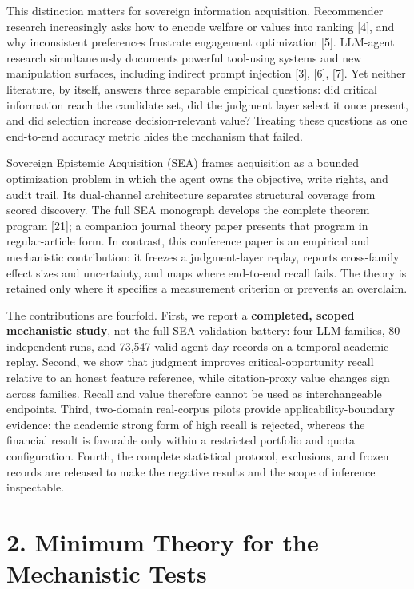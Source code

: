 \documentclass[
  conference,10pt]{IEEEtran}
\begin{document}
This distinction matters for sovereign information acquisition. Recommender research increasingly asks how to encode welfare or values into ranking {[}4{]}, and why inconsistent preferences frustrate engagement optimization {[}5{]}. LLM-agent research simultaneously documents powerful tool-using systems and new manipulation surfaces, including indirect prompt injection {[}3{]}, {[}6{]}, {[}7{]}. Yet neither literature, by itself, answers three separable empirical questions: did critical information reach the candidate set, did the judgment layer select it once present, and did selection increase decision-relevant value? Treating these questions as one end-to-end accuracy metric hides the mechanism that failed.

Sovereign Epistemic Acquisition (SEA) frames acquisition as a bounded optimization problem in which the agent owns the objective, write rights, and audit trail. Its dual-channel architecture separates structural coverage from scored discovery. The full SEA monograph develops the complete theorem program {[}21{]}; a companion journal theory paper presents that program in regular-article form. In contrast, this conference paper is an empirical and mechanistic contribution: it freezes a judgment-layer replay, reports cross-family effect sizes and uncertainty, and maps where end-to-end recall fails. The theory is retained only where it specifies a measurement criterion or prevents an overclaim.

The contributions are fourfold. First, we report a \textbf{completed, scoped mechanistic study}, not the full SEA validation battery: four LLM families, 80 independent runs, and 73,547 valid agent-day records on a temporal academic replay. Second, we show that judgment improves critical-opportunity recall relative to an honest feature reference, while citation-proxy value changes sign across families. Recall and value therefore cannot be used as interchangeable endpoints. Third, two-domain real-corpus pilots provide applicability-boundary evidence: the academic strong form of high recall is rejected, whereas the financial result is favorable only within a restricted portfolio and quota configuration. Fourth, the complete statistical protocol, exclusions, and frozen records are released to make the negative results and the scope of inference inspectable.

\section{2. Minimum Theory for the Mechanistic Tests}\label{minimum-theory-for-the-mechanistic-tests}
\end{document}

